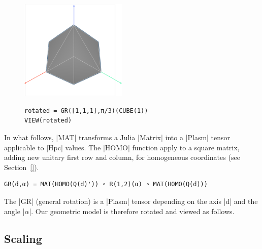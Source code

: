 \begin{figure}[htbp] %
\begin{minipage}[c]{0.35\textwidth}
   \includegraphics[width=2in]{chapter-04/figs/GRcube} 
\end{minipage}
\hfill
\begin{minipage}[c]{0.55\textwidth}
\begin{lstlisting}[language=JuliaLocal, style=julia, mathescape=false]
rotated = GR([1,1,1],π/3)(CUBE(1))
VIEW(rotated)
\end{lstlisting}
\end{minipage}
\end{figure}


\begin{coding}
In what follows, |MAT| transforms a Julia |Matrix| into a |Plasm| tensor applicable to |Hpc| values. 
The |HOMO| function apply to  a square matrix, adding new unitary first row and column, for homogeneous coordinates (see Section~\ref{}).  
\begin{lstlisting}[language=JuliaLocal, style=julia, mathescape=true]
GR(d,α) = MAT(HOMO(Q(d)')) ∘ R(1,2)(α) ∘ MAT(HOMO(Q(d)))
\end{lstlisting}
The |GR| (general rotation) is a |Plasm| tensor depending on the axis |d| and the angle |$\alpha$|. 
Our geometric model is therefore rotated and viewed as follows.
\end{coding}



\subsection*{Scaling}\label{sect:4-2-2}

